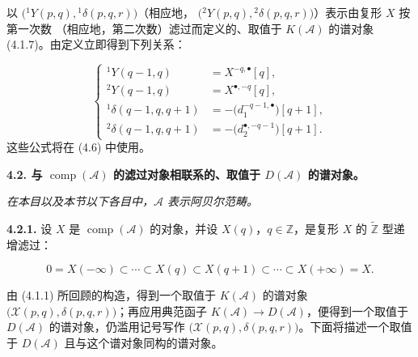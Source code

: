 \clearpage
{}%
\begingroup\small\setlength{\parskip}{0pt}\setlength{\emergencystretch}{1.5em}
\setlength{\abovedisplayskip}{4pt plus 2pt minus 2pt}%
\setlength{\belowdisplayskip}{4pt plus 2pt minus 2pt}%

\noindent 以
$\bigl({}^{1}\!Y(p,q),{}^{1}\!\delta(p,q,r)\bigr)$（相应地，
$\bigl({}^{2}\!Y(p,q),{}^{2}\!\delta(p,q,r)\bigr)$）表示由复形 $X$ 按第一次数
（相应地，第二次数）滤过而定义的、取值于 $K(\mathcal A)$ 的谱对象
(4.1.7)。由定义立即得到下列关系：

\begin{equation}
\left\{
\begin{aligned}
{}^{1}\!Y(q-1,q)&=X^{-q,\bullet}[q],\\
{}^{2}\!Y(q-1,q)&=X^{\bullet,-q}[q],\\
{}^{1}\!\delta(q-1,q,q+1)&=-\bigl(d_1^{-q-1,\bullet}\bigr)[q+1],\\
{}^{2}\!\delta(q-1,q,q+1)&=-\bigl(d_2^{\bullet,-q-1}\bigr)[q+1].
\end{aligned}
\right.
\tag{4.1.9.1}
\end{equation}
这些公式将在 (4.6) 中使用。

\medskip\noindent\textbf{4.2. 与 $\operatorname{comp}(\mathcal A)$
的滤过对象相联系的、取值于 $D(\mathcal A)$ 的谱对象。}

\begin{center}\itshape
在本目以及本节以下各目中，$\mathcal A$ 表示阿贝尔范畴。
\end{center}

\noindent\textbf{4.2.1.}\quad
设 $X$ 是 $\operatorname{comp}(\mathcal A)$ 的对象，并设
$X(q)$，$q\in\mathbb Z$，是复形 $X$ 的
$\widetilde{\mathbb Z}$ 型递增滤过：

\begin{equation}
0=X(-\infty)\subset\cdots\subset X(q)\subset X(q+1)
\subset\cdots\subset X(+\infty)=X.
\tag{4.2.1.1}
\end{equation}

由 (4.1.1) 所回顾的构造，得到一个取值于 $K(\mathcal A)$ 的谱对象
$\bigl(\mathcal X(p,q),\delta(p,q,r)\bigr)$；再应用典范函子
$K(\mathcal A)\longrightarrow D(\mathcal A)$，便得到一个取值于
$D(\mathcal A)$ 的谱对象，仍滥用记号写作
$\bigl(\mathcal X(p,q),\delta(p,q,r)\bigr)$。下面将描述一个取值于
$D(\mathcal A)$ 且与这个谱对象同构的谱对象。

